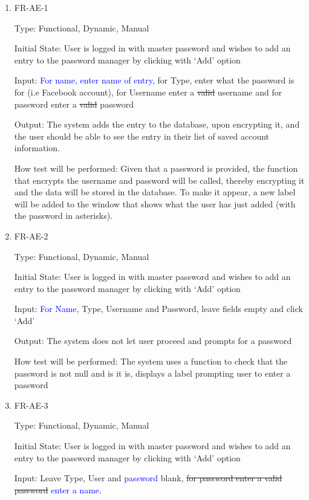 \documentclass[12pt, titlepage]{article}
\begin{document}
\begin{enumerate}
\item{FR-AE-1\\}

Type: Functional, Dynamic, Manual

Initial State: User is logged in with master password and wishes to add an entry to the password manager by clicking with ‘Add’ option

Input: \textcolor{blue}{For name, enter name of entry}, for Type, enter what the password is for (i.e Facebook account), for Username enter a \sout{valid} username and for password enter a \sout{valid} password

Output: The system adds the entry to the database, upon encrypting it, and the user should be able to see the entry in their list of saved account information.

How test will be performed: Given that a password is provided, the function that encrypts the username and password will be called, thereby encrypting it and the data will be stored in the database. To make it appear, a new label will be added to the window that shows what the user has just added (with the password in asterisks).

\item{FR-AE-2\\}

Type: Functional, Dynamic, Manual

Initial State: User is logged in with master password and wishes to add an entry to the password manager by clicking with ‘Add’ option

Input: \textcolor{blue}{For Name}, Type, Username and Password, leave fields empty and click ‘Add’

Output: The system does not let user proceed and prompts for a password

How test will be performed: The system uses a function to check that the password is not null and is it is, displays a label prompting user to enter a password

\item{FR-AE-3\\}

Type: Functional, Dynamic, Manual

Initial State: User is logged in with master password and wishes to add an entry to the password manager by clicking with ‘Add’ option

Input: Leave Type, User and \textcolor{blue}{password} blank, \sout{for password enter a valid password} \textcolor{blue}{enter a name.}


\end{enumerate}
\end{document}
